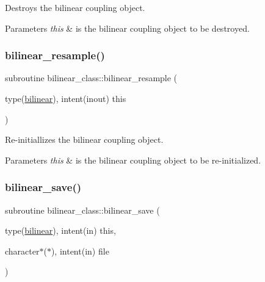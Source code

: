 Destroys the bilinear coupling object. 


\begin{DoxyParams}{Parameters}
{\em this} & is the bilinear coupling object to be destroyed. \\
\hline
\end{DoxyParams}
\mbox{\label{namespacebilinear__class_aac587f5ea6d66ee89ff3210b10569777}} 
\subsubsection{\texorpdfstring{bilinear\+\_\+resample()}{bilinear\_resample()}}
{\footnotesize\ttfamily subroutine bilinear\+\_\+class\+::bilinear\+\_\+resample (\begin{DoxyParamCaption}\item[{type(\hyperlink{structbilinear__class_1_1bilinear}{bilinear}), intent(inout)}]{this }\end{DoxyParamCaption})\hspace{0.3cm}{\ttfamily [private]}}



Re-\/initiallizes the bilinear coupling object. 


\begin{DoxyParams}{Parameters}
{\em this} & is the bilinear coupling object to be re-\/initialized. \\
\hline
\end{DoxyParams}
\mbox{\label{namespacebilinear__class_a5fe875f5d4db31ef7a7e721ba4a0146a}} 
\subsubsection{\texorpdfstring{bilinear\+\_\+save()}{bilinear\_save()}}
{\footnotesize\ttfamily subroutine bilinear\+\_\+class\+::bilinear\+\_\+save (\begin{DoxyParamCaption}\item[{type(\hyperlink{structbilinear__class_1_1bilinear}{bilinear}), intent(in)}]{this,  }\item[{character$\ast$($\ast$), intent(in)}]{file }\end{DoxyParamCaption})\hspace{0.3cm}{\ttfamily [private]}}



